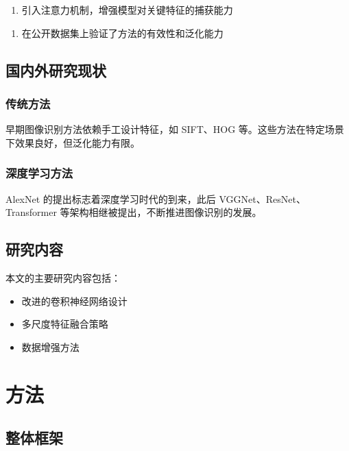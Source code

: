 \documentclass[a4paper]{article}
\theoremstyle{definition}
\theoremstyle{plain}
\theoremstyle{remark}
\begin{document}
\begin{enumerate}[label=（\arabic*）]
  \item 引入注意力机制，增强模型对关键特征的捕获能力
\end{enumerate}

\begin{enumerate}[label=（\arabic*）]
  \item 在公开数据集上验证了方法的有效性和泛化能力
\end{enumerate}

\subsection{国内外研究现状}\label{1-2-国内外研究现状}

\subsubsection{传统方法}\label{1-2-1-传统方法}

早期图像识别方法依赖手工设计特征，如 SIFT\cite{ref3}、HOG 等。这些方法在特定场景下效果良好，但泛化能力有限。


\subsubsection{深度学习方法}\label{1-2-2-深度学习方法}

AlexNet\cite{ref4} 的提出标志着深度学习时代的到来，此后 VGGNet、ResNet、Transformer 等架构相继被提出，不断推进图像识别的发展。


\subsection{研究内容}\label{1-3-研究内容}

本文的主要研究内容包括：


\begin{itemize}
  \item 改进的卷积神经网络设计
  \item 多尺度特征融合策略
  \item 数据增强方法
\end{itemize}

\clearpage
\section{方法}\label{第2章-方法}

\subsection{整体框架}\label{2-1-整体框架}
\end{document}
